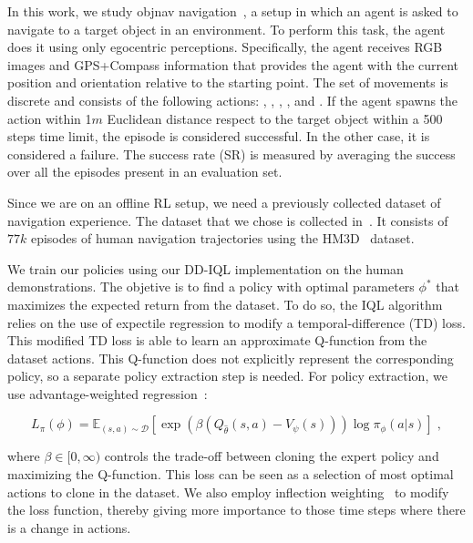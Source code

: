 In this work, we study \acrshort{objnav} navigation~\cite{batra2020}, a setup in which an agent is asked to navigate to a target object in an environment.
To perform this task, the agent does it using only egocentric perceptions.
Specifically, the agent receives RGB images and GPS+Compass information that provides the agent with the current position and orientation relative to the starting point.
The set of movements is discrete and consists of the following actions: \turnleft, \turnright, \moveforward, \lookup, \lookdown and \stopac.
If the agent spawns the \stopac action within 1$m$ Euclidean distance respect to the target object within a 500 steps time limit, the episode is considered successful.
In the other case, it is considered a failure.
The success rate (SR) is measured by averaging the success over all the episodes present in an evaluation set.

Since we are on an offline RL setup, we need a previously collected dataset of navigation experience.
The dataset that we chose is collected in~\cite{ramrakhya2023}.
It consists of $77k$ episodes of human navigation trajectories using the HM3D~\cite{Ramakrishnan2021HabitatMatterport3D} dataset.

We train our policies using our DD-IQL implementation on the human demonstrations.
The objetive is to find a policy with optimal parameters $\phi^*$ that maximizes the expected return from the dataset.
To do so, the IQL algorithm relies on the use of expectile regression to modify a temporal-difference (TD) loss.
This modified TD loss is able to learn an approximate Q-function from the dataset actions.
This Q-function does not explicitly represent the corresponding policy, so a separate policy extraction step is needed.
For policy extraction, we use advantage-weighted regression~\cite{peters2007, peng2019advantageweighted}:

\begin{equation}
    L_\pi(\phi)=\mathbb{E}_{(s, a) \sim \mathcal{D}}\left[\exp \left(\beta\left(Q_{\hat{\theta}}(s, a)-V_\psi(s)\right)\right) \log \pi_\phi(a|s)\right]\; ,
    \label{eq:loss}
\end{equation}

where $\beta \in [0, \infty)$ controls the trade-off between cloning the expert policy and maximizing the Q-function.
This loss can be seen as a selection of most optimal actions to clone in the dataset.
We also employ inflection weighting~\cite{wijmans2019} to modify the loss function, thereby giving more importance to those time steps where there is a change in actions.

